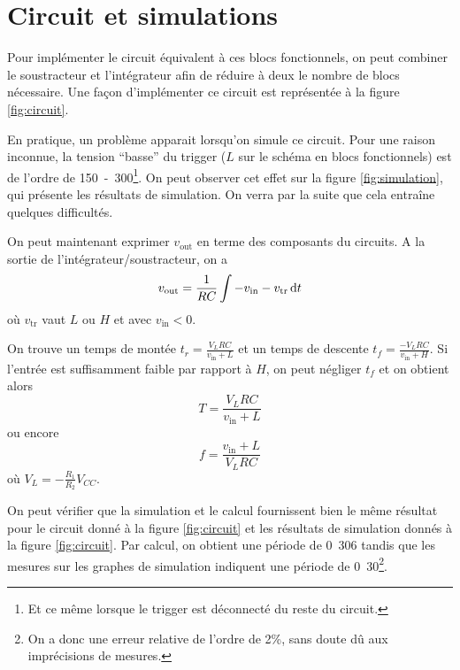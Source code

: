 \section{Circuit et simulations}
Pour implémenter le circuit équivalent à ces blocs fonctionnels,
on peut combiner le soustracteur et l'intégrateur afin
de réduire à deux le nombre de blocs nécessaire. Une façon
d'implémenter ce circuit est représentée à la figure
\ref{fig:circuit}.

En pratique, un problème apparait lorsqu'on
simule ce circuit. Pour une raison inconnue,
la tension ``basse'' du trigger ($L$ sur le schéma
en blocs fonctionnels) est de l'ordre de 
\unit{150-300}{\milli\volt}\footnote{Et ce même
lorsque le trigger est déconnecté du reste du circuit.}.
On peut observer cet effet sur la figure \ref{fig:simulation},
qui présente les résultats de simulation.
On verra par la suite que cela entraîne quelques
difficultés.

On peut maintenant exprimer $v_{\text{out}}$ en terme
des composants du circuits. A la sortie de l'intégrateur/soustracteur,
on a
\begin{equation}
	v_{\text{out}} = \frac{1}{RC} \int -v_{\text{in}} - v_{\text{tr}} \operatorname{d}\! t 
	\label{eq:eq-circ}
\end{equation}
où $v_{\text{tr}}$ vaut $L$ ou $H$ et avec $v_{\text{in}} < 0$.

On trouve un temps de montée $t_r = \frac{V_LRC}{v_{\text{in}} + L}$
et un temps de descente $t_f = \frac{-V_LRC}{v_{\text{in}} + H}$.
Si l'entrée est suffisamment faible par rapport à $H$, on
peut négliger $t_f$ et on obtient alors
\[ T = \frac{V_LRC}{v_{\text{in}} + L} \]
ou encore
\[ f = \frac{v_{\text{in}} + L}{V_LRC} \]
où $V_L = -\frac{R_1}{R_2}V_{CC}$.

On peut vérifier que la simulation et le calcul fournissent
bien le même résultat pour le circuit donné à la figure \ref{fig:circuit}
et les résultats de simulation donnés à la figure \ref{fig:circuit}.
Par calcul, on obtient une période de \unit{0.306}{\milli\second}
tandis que les mesures sur les graphes de simulation indiquent
une période de \unit{0.30}{\milli\second}\footnote{On a donc une
erreur relative de l'ordre de 2\%, sans doute dû aux imprécisions
de mesures.}.

